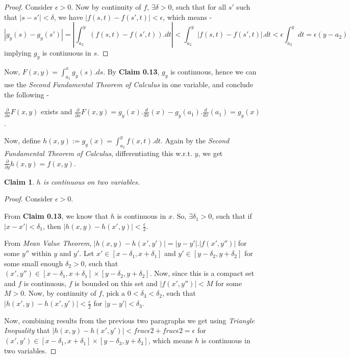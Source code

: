 \documentclass[12pt,a4paper]{article}
\newtheorem{claim}[theorem]{Claim}
\theoremstyle{definition}
\begin{document}
\begin{flushleft}
\begin{proof}
	Consider $\epsilon > 0$. Now by continuity of $f$, $\exists \delta > 0$, such that for all $s'$ such that $|s-s'| < \delta$, we have $|f(s,t) - f(s',t)| < \epsilon$, which means -
	$$|g_y (s) - g_y (s')| = |\int_{a_2}^{y} (f(s,t) - f(s',t)).dt| < \int_{a_2}^{y} |f(s,t) - f(s',t)|.dt < \epsilon \int_{a_2}^{y} dt = \epsilon (y - a_2)$$
	implying $g_y$ is continuous in $s$.
\end{proof}

\medskip

Now, $F(x,y) = \int_{a_1}^{x} g_y(s).ds$. By {\bf Claim 0.13}, $g_y$ is continuous, hence we can use the {\it Second Fundamental Theorem of Calculus} in one variable, and conclude the following -

$\frac{\partial}{\partial x} F(x,y)$ exists and $\frac{\partial}{\partial x} F(x,y) = g_y(x).\frac{d}{dx} (x) - g_y(a_1).\frac{d}{dx} (a_1) = g_y(x)$.

\medskip

Now, define $h(x,y) := g_y (x) = \int_{a_2}^{y} f(x,t).dt$. Again by the {\it Second Fundamental Theorem of Calculus}, differentiating this w.r.t. $y$, we get $\frac{\partial}{\partial y} h(x,y) = f(x,y)$.

\begin{claim}
	$h$ is continuous on two variables.
\end{claim}

\begin{proof}
	Consider $\epsilon > 0$.

	From {\bf Claim 0.13}, we know that $h$ is continuous in $x$. So, $\exists \delta_1 > 0$, such that if $|x - x'| < \delta_1$, then $|h(x,y)-h(x',y)| < \frac{\epsilon}{2}$.

	\medskip

	From {\it Mean Value Theorem}, $|h(x,y)-h(x',y')| = |y-y'|.|f(x',y'')|$ for some $y''$ within $y$ and $y'$. Let $x' \in [x-\delta_1,x+\delta_1]$ and $y' \in [y-\delta_2,y+\delta_2]$ for some small enough $\delta_2 > 0$, such that $(x',y'') \in [x-\delta_1,x+\delta_1] \times [y-\delta_2,y+\delta_2]$. Now, since this is a compact set and $f$ is continuous, $f$ is bounded on this set and $|f(x',y'')| < M$ for some $M > 0$. Now, by continuity of $f$, pick a $0 < \delta_3 < \delta_2$, such that $|h(x',y) - h(x',y')| < \frac{\epsilon}{2}$ for $|y-y'| < \delta_3$.

	\medskip

	Now, combining results from the previous two paragraphs we get using {\it Triangle Inequality} that $|h(x,y) - h(x',y')| < frac{\epsilon}{2} + frac{\epsilon}{2} = \epsilon$ for $(x',y') \in [x-\delta_1,x+\delta_1] \times [y-\delta_3,y+\delta_3]$, which means $h$ is continuous in two variables.
\end{proof}


\end{flushleft}
\end{document}
